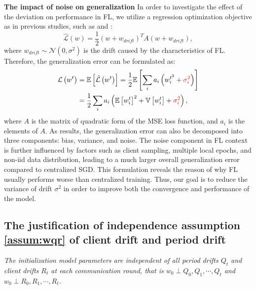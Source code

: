 \textbf{The impact of noise on generalization}
In order to investigate the effect of the deviation on performance in FL, we utilize a regression optimization objective as in previous studies, such as \citep{zhang2019lookahead} and \citep{wu2018understanding}:
$$
\hat{\mathcal{L}}({w})=\frac{1}{2}({w}+{w}_{drift})^T {A}({w}+{w}_{drift}),
$$
where ${w}_{drift} \sim \mathcal{N}(0,\sigma^2)$ is the drift caused by the characteristics of FL. Therefore, the generalization error can be formulated as:
\begin{equation*}
   \begin{aligned}
      \mathcal{L}\left(w^{t}\right)&=\mathbb{E}\left[\hat{\mathcal{L}}\left(w^{t}\right)\right]=\frac{1}{2} \mathbb{E}\left[\sum_i a_i\left(w_i^{t^2}+\textcolor{red}{\sigma_i^2}\right)\right]\\
      &=\frac{1}{2} \sum_i a_i\left(\mathbb{E}\left[w_i^{t}\right]^2+\mathbb{V}\left[w_i^{t}\right]+\textcolor{red}{\sigma_i^2}\right),
   \end{aligned}
\end{equation*}
where $A$ is the matrix of quadratic form of the MSE loss function, and $a_i$ is the elements of $A$. As results, the generalization error can also be decomposed into three components: bias, variance, and noise. The noise component in FL context is further influenced by factors such as client sampling, multiple local epochs, and non-iid data distribution, leading to a much larger overall generalization error compared to centralized SGD. This formulation reveals the reason of why FL usually performs worse than centralized training. Thus, our goal is to reduce the variance of drift $\sigma^2$ in order to improve both the convergence and performance of the model.

\subsection{The justification of independence assumption \ref{assum:wqr} of client drift and period drift}\label{sec:assum2_just}
\begin{assumption}[\ref{assum:wqr}]
   \textit{The initialization model parameters are independent of all period drifts $Q_t$ and client drifts $R_t$ at each communication round, that is $w_0 \perp Q_0, Q_1,\cdots, Q_t$ and $w_0 \perp R_0,  R_1,\cdots, R_t$.}
\end{assumption}

